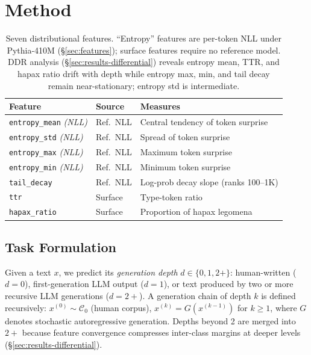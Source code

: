 \section{Method}
\label{sec:method}

\begin{table}[t!]
\centering
\footnotesize
\caption{Seven distributional features. ``Entropy'' features are per-token NLL under Pythia-410M (\S\ref{sec:features}); surface features require no reference model. DDR analysis (\S\ref{sec:results-differential}) reveals entropy mean, TTR, and hapax ratio drift with depth while entropy max, min, and tail decay remain near-stationary; entropy std is intermediate.}
\label{tab:features}
\setlength{\tabcolsep}{4pt}
\begin{tabular}{@{}llp{3.0cm}@{}}
\toprule
\textbf{Feature} & \textbf{Source} & \textbf{Measures} \\
\midrule
\texttt{entropy\_mean} \textit{\scriptsize(NLL)} & Ref.\ NLL & Central tendency of token surprise \\
\texttt{entropy\_std} \textit{\scriptsize(NLL)}  & Ref.\ NLL & Spread of token surprise \\
\texttt{entropy\_max} \textit{\scriptsize(NLL)}  & Ref.\ NLL & Maximum token surprise \\
\texttt{entropy\_min} \textit{\scriptsize(NLL)}  & Ref.\ NLL & Minimum token surprise \\
\texttt{tail\_decay}   & Ref.\ NLL & Log-prob decay slope (ranks 100--1K) \\
\midrule
\texttt{ttr}           & Surface & Type-token ratio \\
\texttt{hapax\_ratio}  & Surface & Proportion of hapax legomena \\
\bottomrule
\end{tabular}
\end{table}

\subsection{Task Formulation}
\label{sec:task}

Given a text $x$, we predict its \emph{generation depth} $d \in \{0, 1, 2{+}\}$: human-written ($d{=}0$), first-generation LLM output ($d{=}1$), or text produced by two or more recursive LLM generations ($d{=}2{+}$).
A generation chain of depth $k$ is defined recursively: $x^{(0)} \sim \mathcal{C}_0$ (human corpus), $x^{(k)} = G(x^{(k-1)})$ for $k \geq 1$, where $G$ denotes stochastic autoregressive generation.
Depths beyond 2 are merged into $2{+}$ because feature convergence compresses inter-class margins at deeper levels (\S\ref{sec:results-differential}).


